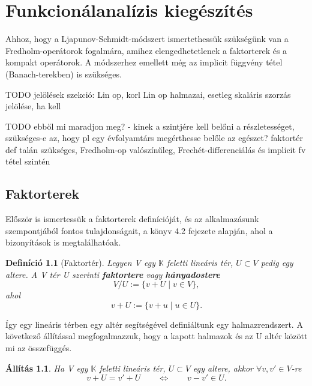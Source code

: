 \documentclass[oneside, titlepage, 12pt, a4paper]{report}
\newtheorem{definition}{Definíció}[section]
\newtheorem{statement}{Állítás}[section]
\begin{document}


\onehalfspacing
\chapter{Funkcionálanalízis kiegészítés}	%
\label{chap:Funcanal_ext}

Ahhoz, hogy a Ljapunov-Schmidt-módszert ismertethessük szükségünk van a Fredholm-operátorok fogalmára, amihez elengedhetetlenek a faktorterek és a kompakt operátorok. A módszerhez emellett még az implicit függvény tétel (Banach-terekben) is szükséges.

TODO jelölések szekció: Lin op, korl Lin op halmazai, esetleg skaláris szorzás jelölése, ha kell

TODO ebből mi maradjon meg? - kinek a szintjére kell belőni a részletességet, szükséges-e az, hogy pl egy évfolyamtárs megérthesse belőle az egészet?
faktortér def talán szükséges, Fredholm-op valószínűleg, Frechét-differenciálás és implicit fv tétel szintén

%
\section{Faktorterek}
\label{sec:Quotient_space}

Először is ismertessük a faktorterek definícióját, és az alkalmazásunk szempontjából fontos tulajdonságait, a \cite{faktorter} könyv 4.2 fejezete alapján, ahol a bizonyítások is megtalálhatóak.
\begin{definition}[Faktortér]
Legyen V egy $\mathbb{K}$ feletti lineáris tér, $U \subset V$ pedig egy altere. A V tér U szerinti \textbf{faktortere} vagy \textbf{hányadostere}
\begin{equation}
V / U := \{v + U \mid v \in V\},
\end{equation}
ahol
\begin{equation}
v + U := \{v + u \mid u \in U \}.
\end{equation}
\end{definition}

Így egy lineáris térben egy altér segítségével definiáltunk egy halmazrendszert. A következő állítással megfogalmazzuk, hogy a kapott halmazok és az U altér között mi az összefüggés.
\begin{statement}
Ha V egy $\mathbb{K}$ feletti lineáris tér, $U \subset V$ egy altere, akkor $\forall v, v' \in V$-re
\begin{equation}
v + U = v' + U \qquad \Leftrightarrow \qquad v - v' \in U.
\end{equation}
\end{statement}
\end{document}
